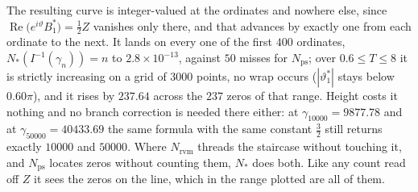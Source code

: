 \documentclass[11pt]{article}
\theoremstyle{definition}
\begin{document}
%
%
%
%
%
The resulting curve is integer-valued at the ordinates and nowhere else, since
$\operatorname{Re}\bigl(e^{i\vartheta}B_1^{\ast}\bigr)=\tfrac12Z$ vanishes only
there, and that advances by exactly one from each ordinate to the next. It lands
on every one of the first $400$ ordinates, $N_{\ast}(I^{-1}(\gamma_n))=n$ to
$2.8\times10^{-13}$, against $50$ misses for $N_{\mathrm{ps}}$; over
$0.6\leq T\leq8$ it is strictly increasing on a grid of $3000$ points, no wrap
occurs ($|\vartheta_1^{\ast}|$ stays below $0.60\pi$), and it rises by $237.64$
across the $237$ zeros of that range. Height costs it nothing and no branch
correction is needed there either: at $\gamma_{10000}=9877.78$ and at
$\gamma_{50000}=40433.69$ the same formula with the same constant $\tfrac32$
still returns exactly $10000$ and $50000$. Where $N_{\mathrm{rvm}}$ threads the
staircase without touching it, and $N_{\mathrm{ps}}$ locates zeros without
counting them, $N_{\ast}$ does both. Like any count read off $Z$ it sees the
zeros on the line, which in the range plotted are all of them.
\end{document}
